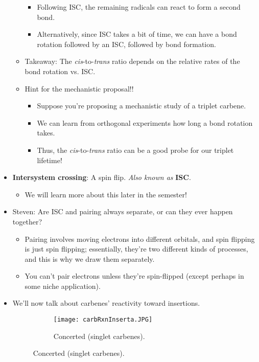 \documentclass[../notes.tex]{subfiles}
\begin{document}
\begin{itemize}
\begin{itemize}
\begin{itemize}
            \item Following ISC, the remaining radicals can react to form a second bond.
            \item Alternatively, since ISC takes a bit of time, we can have a bond rotation followed by an ISC, followed by bond formation.
        \end{itemize}
        \item Takeaway: The \emph{cis}-to-\emph{trans} ratio depends on the relative rates of the bond rotation vs. ISC.
        \item Hint for the mechanistic proposal!!
        \begin{itemize}
            \item Suppose you're proposing a mechanistic study of a triplet carbene.
            \item We can learn from orthogonal experiments how long a bond rotation takes.
            \item Thus, the \emph{cis}-to-\emph{trans} ratio can be a good probe for our triplet lifetime!
        \end{itemize}
    \end{itemize}
    \item \textbf{Intersystem crossing}: A spin flip. \emph{Also known as} \textbf{ISC}.
    \begin{itemize}
        \item We will learn more about this later in the semester!
    \end{itemize}
    \item Steven: Are ISC and pairing always separate, or can they ever happen together?
    \begin{itemize}
        \item Pairing involves moving electrons into different orbitals, and spin flipping is just spin flipping; essentially, they're two different kinds of processes, and this is why we draw them separately.
        \item You can't pair electrons unless they're spin-flipped (except perhaps in some niche application).
    \end{itemize}
    \item We'll now talk about carbenes' reactivity toward insertions.
    \begin{figure}[h!]
        \centering
        \begin{subfigure}[b]{0.39\linewidth}
            \centering
            \texttt{[image: carbRxnInserta.JPG]}
            \caption{Concerted (singlet carbenes).}

\end{subfigure}
\end{figure}
\end{itemize}
\end{document}
